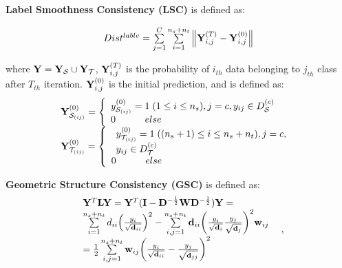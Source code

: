 \documentclass[10pt,twocolumn,letterpaper]{article}
\begin{document}
\begin{CJK*}{UTF8}{gkai}
\textbf{Label Smoothness Consistency (LSC)} is defined as:

\begin{equation}\label{eq:labelconsitency}
	\begin{array}{c}
		Dis{t^{lable}} = \sum\limits_{j = 1}^C {\mathop \sum \limits_{i = 1}^{{n_s} + {n_t}} } \left\| {\bf{Y}}^{(T)}_{i,j}-{\bf{Y}}^{(0)}_{i,j} \right\|
	\end{array}
\end{equation}



where ${\bf{Y}} = {{\bf{Y}}_{\cal S}} \cup {{\bf{Y}}_{\cal T}}$,  ${\bf{Y}}_{i,j}^{(T)}$ is the probability of ${i_{th}}$ data belonging to ${j_{th}}$ class after ${T_{th}}$ iteration. ${\bf{Y}}_{i,j}^{(0)}$ is the initial prediction, and is defined as:
\vspace{-5pt}
\begin{equation}\label{eq:labelconsistency1}
\begin{array}{*{20}{l}}
{{\bf{Y}}_{{{\cal S}_{(ij)}}}^{(0)} = \left\{ {\begin{array}{*{20}{l}}
		{y_{{{\cal S}_{(ij)}}}^{(0)} = 1\;(1 \le i \le {n_s}),j = c,{y_{ij}} \in D_{\cal S}^{(c)}}\\
		{0\;\;\;\;\;\;\;\;\;\;\;else}
		\end{array}} \right.}\\
{{\bf{Y}}_{{{\cal T}_{(ij)}}}^{(0)} = \left\{ {\begin{array}{*{20}{l}}
		\begin{array}{l}
		y_{{{\cal T}_{(ij)}}}^{(0)} = 1\;(({n_s} + 1) \le i \le {n_s} + {n_t}),j = c,\\
		{y_{ij}} \in D_{\cal T}^{(c)}
		\end{array}\\
		{0\;\;\;\;\;\;\;\;\;\;\;else}
		\end{array}} \right.}
\end{array}
\end{equation}


\textbf{Geometric Structure Consistency (GSC)} is defined as: 
\begin{equation}\label{eq:YLY}
		\begin{array}{c}
		\begin{array}{l}
		\begin{array}{l}
		{{\bf{Y}}^T}{\bf{L}}{\bf{Y}} = {{\bf{Y}}^T}({\bf{I}} - {{\bf{D}}^{ - \frac{1}{2}}}{\bf{W}}{{\bf{D}}^{ - \frac{1}{2}}}){\bf{Y}} = \\
		\sum\limits_{i = 1}^{{n_s} + {n_t}} {{d_{ii}}{{\left( {\frac{{{y_i}}}{{\sqrt {{{\bf{d}}_{ii}}} }}} \right)}^2}}  - \sum\limits_{i,j = 1}^{{n_s} + {n_t}} {{{\bf{d}}_{ii}}{{\left( {\frac{{{y_i}}}{{\sqrt {{{\bf{d}}_i}} }}\frac{{{y_j}}}{{\sqrt {{{\bf{d}}_j}} }}} \right)}^2}} {{\bf{w}}_{ij}}\;\\
		= \frac{1}{2}\sum\limits_{i,j = 1}^{{n_s} + {n_t}} {{{\bf{w}}_{ij}}{{\left( {\frac{{{y_i}}}{{\sqrt {{{\bf{d}}_{ii}}} }} - \frac{{{y_j}}}{{\sqrt {{{\bf{d}}_{jj}}} }}} \right)}^2}} 
		\end{array}
		\end{array},
		\end{array}
		\end{equation}


\end{CJK*}
\end{document}

